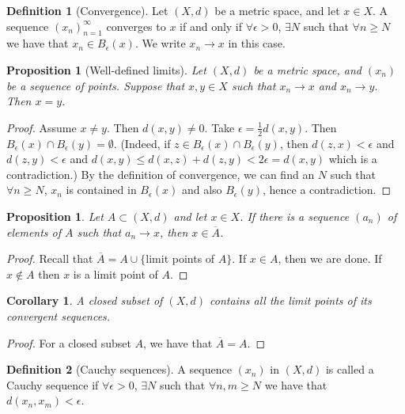 \documentclass{article}
\theoremstyle{definition}
\newtheorem{defn}{Definition}[section]
\theoremstyle{plain}%
\newtheorem{prop}[thm]{Proposition}
\newtheorem*{cor}{Corollary}
\theoremstyle{remark}
\newcommand{\union}{\cup}
\begin{document}
\begin{defn}[Convergence]
Let $(X,d)$ be a metric space, and let $x \in X$. A sequence $(x_n)_{n=1}^{\infty}$ converges to $x$ if and only if $\forall \epsilon > 0$, $\exists N$ such that $\forall n \ge N$ we have that $x_n \in B_{\epsilon}(x)$. We write $x_n \to x$ in this case.
\end{defn}

\begin{prop}[Well-defined limits]
Let $(X,d)$ be a metric space, and $(x_n)$ be a sequence of points. Suppose that $x,y \in X$ such that $x_n \to x$ and $x_n \to y$. Then $x=y$.
\end{prop}

\begin{proof}
Assume $x \ne y$. Then $d(x,y) \ne 0$. Take $\epsilon = \frac{1}{2} d(x,y)$. Then $B_{\epsilon}(x) \cap B_{\epsilon}(y) = \emptyset$. (Indeed, if $z \in B_{\epsilon}(x) \cap B_{\epsilon}(y)$, then $d(z,x) < \epsilon$ and $d(z,y) < \epsilon$ and $d(x,y) \le d(x,z) + d(z,y) < 2\epsilon = d(x,y)$ which is a contradiction.) By the definition of convergence, we can find an $N$ such that $\forall n \ge N$, $x_n$ is contained in $B_{\epsilon}(x)$ and also $B_{\epsilon}(y)$, hence a contradiction.
\end{proof}

\begin{prop}
Let $A \subset (X,d)$ and let $x \in X$. If there is a sequence $(a_n)$ of elements of $A$ such that $a_n \to x$, then $x \in \overline{A}$.
\end{prop}

\begin{proof}
Recall that $\overline{A} = A \union \{$limit points of $A \}$. If $x \in A$, then we are done. If $x \not\in A$ then $x$ is a limit point of $A$.
\end{proof}

\begin{cor}
A closed subset of $(X,d)$ contains all the limit points of its convergent sequences.
\end{cor}

\begin{proof}
For a closed subset $A$, we have that $\overline{A} = A$.
\end{proof}

\begin{defn}[Cauchy sequences]
A sequence $(x_n)$ in $(X,d)$ is called a Cauchy sequence if $\forall \epsilon > 0$, $\exists N$ such that $\forall n, m \ge N$ we have that $d(x_n, x_m) < \epsilon$.
\end{defn}
\end{document}
